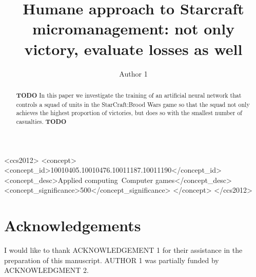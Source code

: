 \documentclass[sigconf, authordraft]{acmart}
\begin{document}
\title{Humane approach to Starcraft micromanagement: not only victory, evaluate losses as well}

\author{Author 1}

\begin{abstract}
  {\bf TODO} In this paper we investigate the training of an
  artificial neural network that controls a squad of units in the
  StarCraft:Brood Wars game so that the squad not only achieves the
  highest proportion of victories, but does so with the smallest
  number of casualties. {\bf TODO}
\end{abstract}

\begin{CCSXML}
<ccs2012>
<concept>
<concept_id>10010405.10010476.10011187.10011190</concept_id>
<concept_desc>Applied computing~Computer games</concept_desc>
<concept_significance>500</concept_significance>
</concept>
</ccs2012>
\end{CCSXML}




\maketitle
















\section*{Acknowledgements}

I would like to thank ACKNOWLEDGEMENT 1 for their assistance in the
preparation of this manuscript. AUTHOR 1 was partially funded by
ACKNOWLEDGMENT 2.


{}
\end{document}
